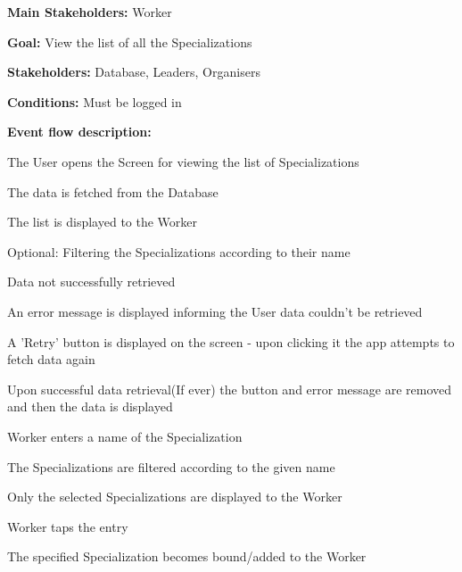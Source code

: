 				\noindent {}
				\begin{packed_item}
					\item \textbf{Main Stakeholders:} Worker
					\item \textbf{Goal:} View the list of all the Specializations
					\item \textbf{Stakeholders: } Database, Leaders, Organisers
					\item \textbf{Conditions: } Must be logged in
					\item \textbf{Event flow description: }
					\begin{packed_enum}
						\item The User opens the Screen for viewing the list of Specializations
						\item The data is fetched from the Database
						\item The list is displayed to the Worker
						\item Optional: Filtering the Specializations according to their name
					\end{packed_enum}
					
					\begin{packed_item}
						\item[1.a] Data not successfully retrieved
						\item[] \begin{packed_enum}
							\item An error message is displayed informing the User data couldn't be retrieved
							\item A 'Retry' button is displayed on the screen - upon clicking it the app attempts to fetch data again
							\item Upon successful data retrieval(If ever) the button and error message are removed and then the data is displayed
						\end{packed_enum}
						
						\item[3.a] Worker enters a name of the Specialization
						\item[] \begin{packed_enum}
							\item The Specializations are filtered according to the given name
							\item Only the selected Specializations are displayed to the Worker
						\end{packed_enum}
						
						\item[] Worker taps the entry
						\item[] \begin{packed_enum}
							\item The specified Specialization becomes bound/added to the Worker
						\end{packed_enum}
					\end{packed_item}
					
				\end{packed_item}
			
